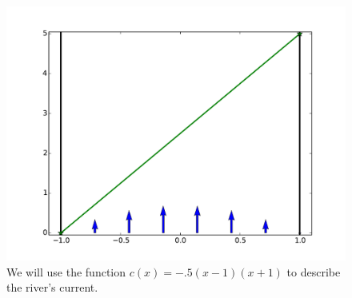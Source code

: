\begin{figure}
\centering
\includegraphics[width=\textwidth]{rivercurrent.pdf}
\caption{We will use the function $c(x) = -.5(x-1)(x+1)$ to describe the river's current.}
\label{fig:rivercrossing_current}
\end{figure}







